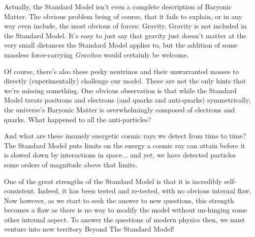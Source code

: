 Actually, the Standard Model isn't even a complete description of Baryonic Matter. The obvious problem being of course, that it fails to explain, or in any way even include, the most obvious of forces: Gravity. Gravity is not included in the Standard Model. It's easy to just say that gravity just doesn't matter at the very small distances the Standard Model applies to, but the addition of some massless force-carrying \textit{Graviton} would certainly be welcome.

Of course, there's also these pesky neutrinos and their unwarranted masses to directly (experimentally) challenge our model. These are not the only hints that we're missing something. One obvious observation is that while the Standard Model treats positrons and electrons (and quarks and anti-quarks) symmetrically, the universe's Baryonic Matter is overwhelmingly composed of electrons and quarks. What happened to all the anti-particles?

And what are these insanely energetic cosmic rays we detect from time to time? The Standard Model puts limits on the energy a cosmic ray can attain before it is slowed down by interactions in space... and yet, we have detected particles some orders of magnitude above that limits.

One of the great strengths of the Standard Model is that it is incredibly self-consistent. Indeed, it has been tested and re-tested, with no obvious internal flaw. Now however, as we start to seek the answer to new questions, this strength becomes a flaw as there is no way to modify the model without un-hinging some other internal aspect. To answer the questions of modern physics then, we must venture into new territory Beyond The Standard Model!